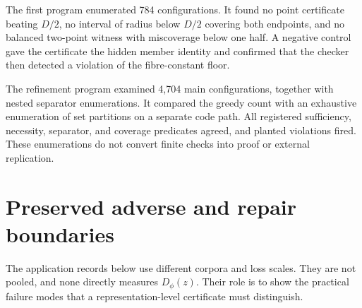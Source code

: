 \documentclass[10pt]{article}
\newcommand{\1}{\mathbf{1}}
\begin{document}
The first program enumerated 784 configurations. It found no point certificate beating $D/2$, no interval of radius below $D/2$ covering both endpoints, and no balanced two-point witness with miscoverage below one half. A negative control gave the certificate the hidden member identity and confirmed that the checker then detected a violation of the fibre-constant floor.

The refinement program examined 4,704 main configurations, together with nested separator enumerations. It compared the greedy count with an exhaustive enumeration of set partitions on a separate code path. All registered sufficiency, necessity, separator, and coverage predicates agreed, and planted violations fired. These enumerations do not convert finite checks into proof or external replication.

\section{Preserved adverse and repair boundaries}
The application records below use different corpora and loss scales. They are not pooled, and none directly measures $D_\phi(z)$. Their role is to show the practical failure modes that a representation-level certificate must distinguish.
\end{document}
